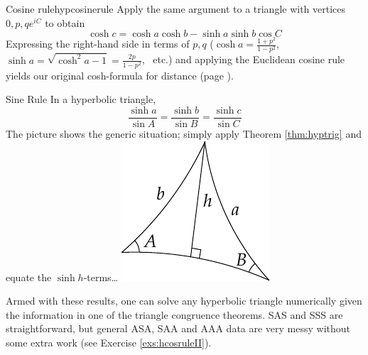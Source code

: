 \begin{cor}{Cosine rule}{hypcosinerule}
	Apply the same argument to a triangle with vertices $0,p,qe^{iC}$ to obtain
	\[
		\cosh c=\cosh a\cosh b-\sinh a\sinh b\cos C
	\]
	Expressing the right-hand side in terms of $p,q$ ($\cosh a=\frac{1+p^2}{1-p^2}$, $\sinh a=\sqrt{\cosh^2\!a-1}=\frac{2p}{1-p^2}$, \ etc.) and applying the Euclidean cosine rule yields our original cosh-formula for distance (page \pageref{lemm:distformula}).
\end{cor}


\begin{cor}[lower separated=false, sidebyside, sidebyside align=top seam, sidebyside gap=0pt, righthand width=0.25\linewidth]{Sine Rule}{}
	In a hyperbolic triangle,
	\[
		\frac{\sinh a}{\sin A}=\frac{\sinh b}{\sin B}=\frac{\sinh c}{\sin C}
	\]
	The picture shows the generic situation; simply apply Theorem \ref{thm:hyptrig} and equate the $\sinh h$-terms\ldots
	\tcblower
	\flushright\includegraphics{isom-sine}
\end{cor}

Armed with these results, one can solve any hyperbolic triangle numerically given the information in one of the triangle congruence theorems. SAS and SSS are straightforward, but general ASA, SAA and AAA data are very messy without some extra work (see Exercise \ref{exs:hcosruleII}).

